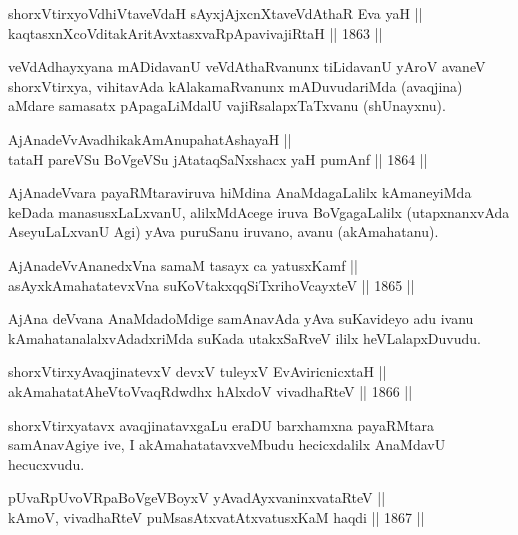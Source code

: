 \begin{shl}
shorxVtirxyoV\s dhiVtaveVdaH sAyxjAjxcnXtaveVdAthaR Eva yaH || \\
kaqtasxnXcoVditakAritAvxtasxvaRpApavivajiRtaH ||  1863 ||  
\end{shl}

\begin{artha}
veVdAdhayxyana mADidavanU veVdAthaRvanunx tiLidavanU yAroV avaneV
shorxVtirxya, vihitavAda kAlakamaRvanunx mADuvudariMda (avaqjina)
aMdare samasatx pApagaLiMdalU vajiRsalapxTaTxvanu (shUnayxnu).
\end{artha}


\begin{shl}
AjAnadeVvAvadhikakAmAnupahatAshayaH || \\
tataH pareVSu BoVgeVSu jAtataqSaNxshacx yaH pumAnf ||  1864 ||  
\end{shl}

\begin{artha}
AjAnadeVvara payaRMtaraviruva hiMdina AnaMdagaLalilx kAmaneyiMda
keDada manasusxLaLxvanU, alilxMdAcege iruva BoVgagaLalilx
(utapxnanxvAda AseyuLaLxvanU Agi) yAva puruSanu iruvano, avanu
(akAmahatanu).
\end{artha}

\begin{shl}
AjAnadeVvAnanedxVna samaM tasayx ca yatusxKamf ||  \\
asAyxkAmahatatevxVna suKoVtakxqqSiTxrihoVcayxteV ||  1865 ||  
\end{shl}

\begin{artha}
AjAna deVvana AnaMdadoMdige samAnavAda yAva suKavideyo adu ivanu
kAmahatanalalxvAdadxriMda suKada utakxSaRveV ililx heVLalapxDuvudu.
\end{artha}

\begin{shl}
shorxVtirxyAvaqjinatevxV devxV tuleyxV EvA\s \s viricnicxtaH || \\
akAmahatatAheVtoVvaqRdwdhx hAlxdoV vivadhaRteV ||  1866 ||  
\end{shl}

\begin{artha}
shorxVtirxyatavx avaqjinatavxgaLu eraDU barxhamxna payaRMtara
samAnavAgiye ive, I akAmahatatavxveMbudu hecicxdalilx AnaMdavU
hecucxvudu.
\end{artha}

\begin{shl}
pUvaRpUvoVRpaBoVgeVBoyxV yAvadAyxvaninxvataRteV || \\
kAmoV, vivadhaRteV puMsasAtxvatAtxvatusxKaM haqdi ||  1867 ||  
\end{shl}


